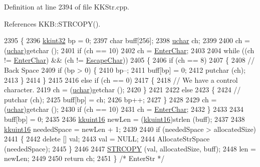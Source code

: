 Definition at line 2394 of file K\+K\+Str.\+cpp.



References K\+K\+B\+::\+S\+T\+R\+C\+O\+P\+Y().


\begin{DoxyCode}
2395 \{
2396   \hyperlink{namespace_k_k_b_a8fa4952cc84fda1de4bec1fbdd8d5b1b}{kkint32} bp = 0;
2397   \textcolor{keywordtype}{char}  buff[256];
2398   \hyperlink{namespace_k_k_b_ace9969169bf514f9ee6185186949cdf7}{uchar}  ch;
2399   
2400   ch = (\hyperlink{namespace_k_k_b_ace9969169bf514f9ee6185186949cdf7}{uchar})getchar ();
2401   \textcolor{keywordflow}{if}  (ch == 10)
2402     ch = \hyperlink{_k_k_str_8h_aa654bee7cdb6eb72abcd5bcd43aa632e}{EnterChar};
2403 
2404   \textcolor{keywordflow}{while}  ((ch != \hyperlink{_k_k_str_8h_aa654bee7cdb6eb72abcd5bcd43aa632e}{EnterChar}) && (ch != \hyperlink{_k_k_str_8h_a88867d2f650ef0c94b5c5047585c730b}{EscapeChar}))
2405     \{
2406       \textcolor{keywordflow}{if}  (ch == 8)
2407         \{
2408           \textcolor{comment}{// Back Space }
2409           \textcolor{keywordflow}{if}  (bp > 0)  \{
2410              bp--;
2411              buff[bp] = 0;
2412              putchar (ch);
2413             \}
2414         \}
2415       
2416       \textcolor{keywordflow}{else} \textcolor{keywordflow}{if}  (ch == 0)
2417         \{
2418           \textcolor{comment}{// We have a control character.}
2419           ch = (\hyperlink{namespace_k_k_b_ace9969169bf514f9ee6185186949cdf7}{uchar})getchar ();
2420         \}
2421 
2422       \textcolor{keywordflow}{else}
2423         \{
2424           \textcolor{comment}{// putchar (ch);}
2425           buff[bp] = ch;
2426           bp++;
2427         \}
2428 
2429       ch = (\hyperlink{namespace_k_k_b_ace9969169bf514f9ee6185186949cdf7}{uchar})getchar ();
2430       \textcolor{keywordflow}{if}  (ch == 10)
2431         ch = \hyperlink{_k_k_str_8h_aa654bee7cdb6eb72abcd5bcd43aa632e}{EnterChar};
2432     \}
2433 
2434   buff[bp] = 0;
2435 
2436   \hyperlink{namespace_k_k_b_aa8c7d4d30381c8a0b6fce68974a9c8a9}{kkuint16}  newLen = (\hyperlink{namespace_k_k_b_aa8c7d4d30381c8a0b6fce68974a9c8a9}{kkuint16})strlen (buff);
2437 
2438   \hyperlink{namespace_k_k_b_aa8c7d4d30381c8a0b6fce68974a9c8a9}{kkuint16}  neededSpace = newLen + 1;
2439 
2440   \textcolor{keywordflow}{if}  (neededSpace > allocatedSize)
2441   \{
2442     \textcolor{keyword}{delete}  [] val;
2443     val = NULL;
2444     AllocateStrSpace (neededSpace);
2445   \}
2446 
2447   \hyperlink{namespace_k_k_b_a9fae0fac72d1e210c67d62c4992847e0}{STRCOPY} (val, allocatedSize, buff);
2448   len = newLen;
2449 
2450   \textcolor{keywordflow}{return}  ch;
2451 \}  \textcolor{comment}{/* EnterStr */}
\end{DoxyCode}
